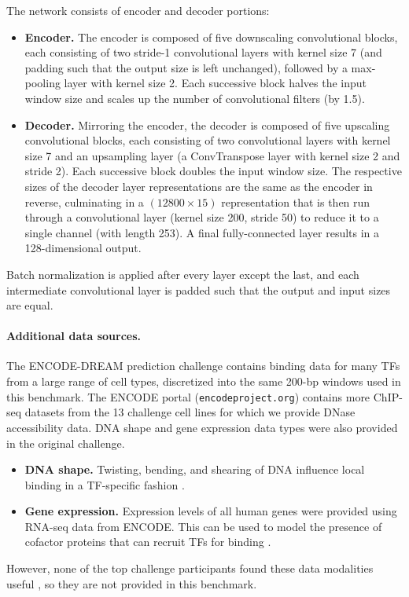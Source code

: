 The network consists of encoder and decoder portions:
\begin{itemize}
\item
\textbf{Encoder. } The encoder is composed of five downscaling convolutional blocks, each consisting of two stride-1 convolutional layers with kernel size 7 (and padding such that the output size is left unchanged), followed by a max-pooling layer with kernel size 2.
Each successive block halves the input window size and scales up the number of convolutional filters (by 1.5).
\item
\textbf{Decoder. } Mirroring the encoder, the decoder is composed of five upscaling convolutional blocks, each consisting of two convolutional layers with kernel size 7 and an upsampling layer (a ConvTranspose layer with kernel size 2 and stride 2).
Each successive block doubles the input window size.
The respective sizes of the decoder layer representations are the same as the encoder in reverse, culminating in a $(12800 \times 15)$ representation that is then run through a convolutional layer (kernel size 200, stride 50) to reduce it to a single channel (with length 253).
A final fully-connected layer results in a 128-dimensional output.
\end{itemize}
Batch normalization is applied after every layer except the last, and each intermediate convolutional layer is padded such that the output and input sizes are equal.

\paragraph{Additional data sources.}
The ENCODE-DREAM prediction challenge contains binding data for many TFs from a large range of cell types,
discretized into the same 200-bp windows used in this benchmark.
The ENCODE portal (\texttt{encodeproject.org}) contains more ChIP-seq datasets from the 13 challenge cell lines for which we provide DNase accessibility data.
DNA shape and gene expression data types were also provided in the original challenge.
\begin{itemize}
\item
\textbf{DNA shape. } Twisting, bending, and shearing of DNA influence local binding in a TF-specific fashion \citep{RohsShape09}.
\item
\textbf{Gene expression. } Expression levels of all human genes were provided using RNA-seq data from ENCODE. This can be used to model the presence of cofactor proteins that can recruit TFs for binding \citep{PG97}.
\end{itemize}
However, none of the top challenge participants found these data modalities useful \citep{EDneurips17}, so they are not provided in this benchmark.



